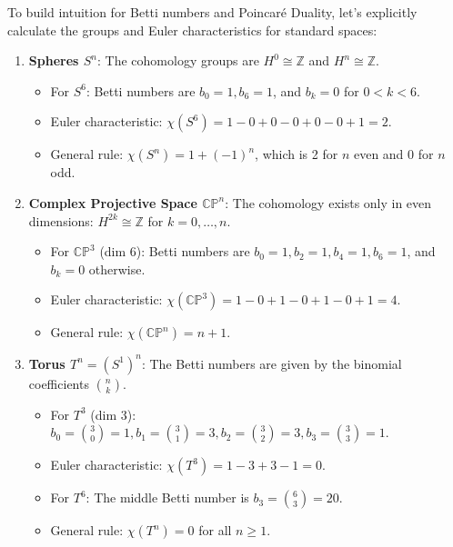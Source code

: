 \begin{remark}
To build intuition for Betti numbers and Poincaré Duality, let's explicitly calculate the groups and Euler characteristics for standard spaces:
\begin{enumerate}
    \item \textbf{Spheres $S^n$}:
    The cohomology groups are $H^0 \cong \mathbb{Z}$ and $H^n \cong \mathbb{Z}$.
    \begin{itemize}
        \item For $S^6$: Betti numbers are $b_0=1, b_6=1$, and $b_k=0$ for $0 < k < 6$.
        \item Euler characteristic: $\chi(S^6) = 1 - 0 + 0 - 0 + 0 - 0 + 1 = 2$.
        \item General rule: $\chi(S^n) = 1 + (-1)^n$, which is 2 for $n$ even and 0 for $n$ odd.
    \end{itemize}
    
    \item \textbf{Complex Projective Space $\mathbb{CP}^n$}:
    The cohomology exists only in even dimensions: $H^{2k} \cong \mathbb{Z}$ for $k=0, \dots, n$.
    \begin{itemize}
        \item For $\mathbb{CP}^3$ (dim 6): Betti numbers are $b_0=1, b_2=1, b_4=1, b_6=1$, and $b_k=0$ otherwise.
        \item Euler characteristic: $\chi(\mathbb{CP}^3) = 1 - 0 + 1 - 0 + 1 - 0 + 1 = 4$.
        \item General rule: $\chi(\mathbb{CP}^n) = n+1$.
    \end{itemize}
    
    \item \textbf{Torus $T^n = (S^1)^n$}:
    The Betti numbers are given by the binomial coefficients $\binom{n}{k}$.
    \begin{itemize}
        \item For $T^3$ (dim 3): $b_0 = \binom{3}{0}=1, b_1 = \binom{3}{1}=3, b_2 = \binom{3}{2}=3, b_3 = \binom{3}{3}=1$.
        \item Euler characteristic: $\chi(T^3) = 1 - 3 + 3 - 1 = 0$.
        \item For $T^6$: The middle Betti number is $b_3 = \binom{6}{3} = 20$.
        \item General rule: $\chi(T^n) = 0$ for all $n \ge 1$.
    \end{itemize}
    

\end{enumerate}
\end{remark}
